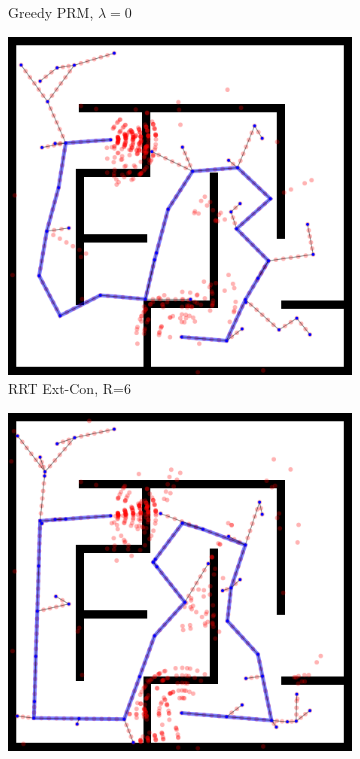 \documentclass{report}
\begin{document}
\begin{figure}
\begin{subfigure}[b]{0.3\textwidth}
\caption{Greedy PRM, $\lambda=0$}
\end{subfigure}%
\vspace{0.05in}
\begin{subfigure}[b]{0.3\textwidth}
\includegraphics[width=\textwidth]{figs/compare-2d-rrtc1-rrtextcon-r6-s1.png}
\caption{RRT Ext-Con, R=6}
\end{subfigure}%
\quad
\begin{subfigure}[b]{0.3\textwidth}
\includegraphics[width=\textwidth]{figs/compare-2d-rrtc1-rrtconcon-r6-s1.png}

\end{subfigure}
\end{figure}
\end{document}
